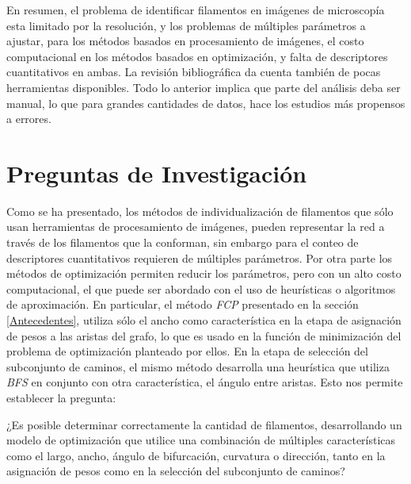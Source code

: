\documentclass{article}
\begin{document}
En resumen, el problema de identificar filamentos en im\'agenes de microscop\'ia esta limitado por la resoluci\'on, y los problemas de m\'ultiples par\'ametros a ajustar, para los m\'etodos basados en procesamiento de im\'agenes, el costo computacional en los m\'etodos basados en optimizaci\'on, y falta de descriptores cuantitativos en ambas. La revisi\'on bibliogr\'afica da cuenta tambi\'en de pocas herramientas disponibles. Todo lo anterior implica que parte del an\'alisis deba ser manual, lo que para grandes cantidades de datos, hace los estudios m\'as propensos a errores. 

\section{Preguntas de Investigaci\'on}

Como se ha presentado, los m\'etodos de individualizaci\'on de filamentos que s\'olo usan herramientas de procesamiento de im\'agenes, pueden representar la red a trav\'es de los filamentos que la conforman, sin embargo para el conteo de descriptores cuantitativos requieren de m\'ultiples par\'ametros. Por otra parte los m\'etodos de optimizaci\'on permiten reducir los par\'ametros, pero con un alto costo computacional, el que puede ser abordado con el uso de heur\'isticas o algoritmos de aproximaci\'on. 
En particular, el m\'etodo {\it FCP} presentado en la secci\'on \ref{Antecedentes}, utiliza s\'olo el ancho como caracter\'istica en la etapa de asignaci\'on de pesos a las aristas del grafo, lo que es usado en la funci\'on de minimizaci\'on del problema de optimizaci\'on planteado por ellos. En la etapa de selecci\'on del subconjunto de caminos, el mismo m\'etodo desarrolla una heur\'istica que utiliza {\it BFS} en conjunto con otra caracter\'istica, el \'angulo entre aristas.
Esto nos permite establecer la pregunta:

\smallskip
¿Es posible determinar correctamente la cantidad de filamentos, desarrollando un modelo de optimizaci\'on que utilice una combinaci\'on de m\'ultiples caracter\'isticas como el largo, ancho, ángulo de bifurcación, curvatura o dirección, tanto en la asignaci\'on de pesos como en la selecci\'on del subconjunto de caminos?
\smallskip
\end{document}
